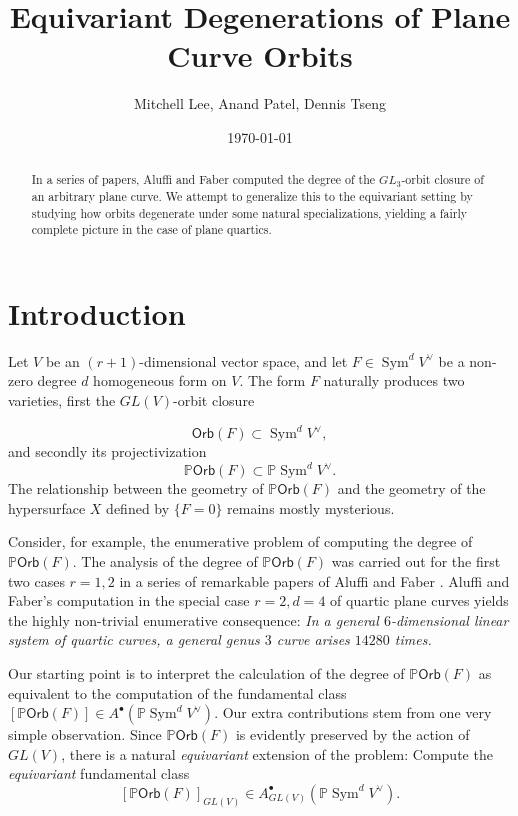 \documentclass[12 pt, reqno]{amsart}
\title{Equivariant Degenerations of Plane Curve Orbits}
\author{Mitchell Lee, Anand Patel, Dennis Tseng}
\date{\today}
\theoremstyle{definition}
\newcommand{\on}{\operatorname}
\newcommand{\mb}{\mathbb}
\renewcommand{\P}{\mb{P}}
\newcommand{\Orb}{\mathsf{Orb}}
\begin{document}
\maketitle
\begin{abstract}


  In a series of papers, Aluffi and Faber computed the degree of the
  $GL_3$-orbit closure of an arbitrary plane curve. We attempt to
  generalize this to the equivariant setting by studying how orbits
  degenerate under some natural specializations, yielding a fairly
  complete picture in the case of plane
  quartics. 

\end{abstract}

\section{Introduction}


Let $V$ be an $(r+1)$-dimensional vector space, and let
$F \in \on{Sym}^{d}V^\vee$ be a non-zero degree $d$ homogeneous form
on $V$. The form $F$ naturally produces two varieties, first the
$GL(V)$-orbit closure

\[\Orb(F) \subset \on{Sym}^{d}V^\vee,\] and secondly its
projectivization
\[\P \Orb(F) \subset \P\on{Sym}^{d}V^\vee.\]  The relationship between the
geometry of $\P \Orb(F)$ and the geometry of the hypersurface $X$
defined by $\{F=0\}$ remains mostly mysterious.

Consider, for example, the enumerative problem of computing the degree
of $\P \Orb(F)$. The analysis of the degree of $\P \Orb(F)$ was
carried out for the first two cases $r=1,2$ in a series of remarkable
papers of Aluffi and Faber
\cite{AFpoint,AF93,AFsmall1,AFsmall2,AF00,AFpgl1,AFpgl2}.  Aluffi and
Faber's computation in the special case $r=2, d=4$ of quartic plane
curves yields the highly non-trivial enumerative consequence: {\sl In
  a general $6$-dimensional linear system of quartic curves, a general
  genus $3$ curve arises $14280$ times.}

Our starting point is to interpret the calculation of the degree of
$\P \Orb(F)$ as equivalent to the computation of the fundamental class
$[\P \Orb(F)] \in A^{\bullet}(\P \on{Sym}^{d}V^{\vee})$. Our extra
contributions stem from one very simple observation. Since
$\P \Orb(F)$ is evidently preserved by the action of $GL(V)$, there is
a natural {\sl equivariant} extension of the problem: Compute the {\sl
  equivariant} fundamental class
\[[\P \Orb(F)]_{GL(V)} \in A^{\bullet}_{GL(V)}(\P
  \on{Sym}^{d}V^{\vee}).\]
\end{document}
